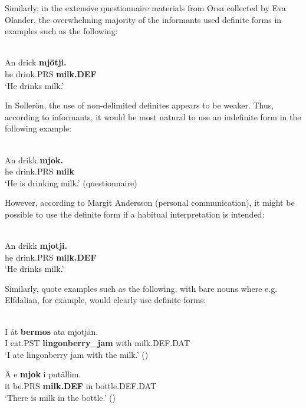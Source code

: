 Similarly, in the extensive questionnaire materials from Orsa collected by Eva Olander, the overwhelming majority of the informants used definite forms in examples such as the following:

\ea \label{} 
\\
\gll An  drick  \textbf{mjötji.}\\
he  drink.PRS  \textbf{milk.DEF}\\
\glt ‘He drinks milk.’

\z

In Sollerön, the use of non-delimited definites appears to be weaker. Thus, according to informants, it would be most natural to use an indefinite form in the following example:

\ea \label{} 
\\
\gll An  drikk  \textbf{mjok.}\\
he  drink.PRS  \textbf{milk}\\
\glt ‘He is drinking milk.’ (questionnaire)

\z

However, according to Margit Andersson (personal communication), it might be possible to use the definite form if a habitual interpretation is intended:

\ea \label{} 
\\
\gll An  drikk  \textbf{mjotji.}\\
he  drink.PRS  \textbf{milk.DEF}\\
\glt ‘He drinks milk.’ 

\z

Similarly, \citet{AnderssonEtAl1999} quote examples such as the following, with bare nouns where e.g. Elfdalian, for example, would clearly use definite forms:

\ea\label{}
\\
\gll I  åt  \textbf{bermos} ata  mjotjän.\\
I  eat.PST  \textbf{lingonberry\_jam} with  milk.DEF.DAT\\
\glt ‘I ate lingonberry jam with the milk.’ (\citet[373]{AnderssonEtAl1999})

\z

\ea
\gll Ä  e  \textbf{mjok} i  putällim.\\
it  be.PRS  \textbf{milk.DEF} in  bottle.DEF.DAT\\
\glt ‘There is milk in the bottle.’ (\citet[373]{AnderssonEtAl1999})

